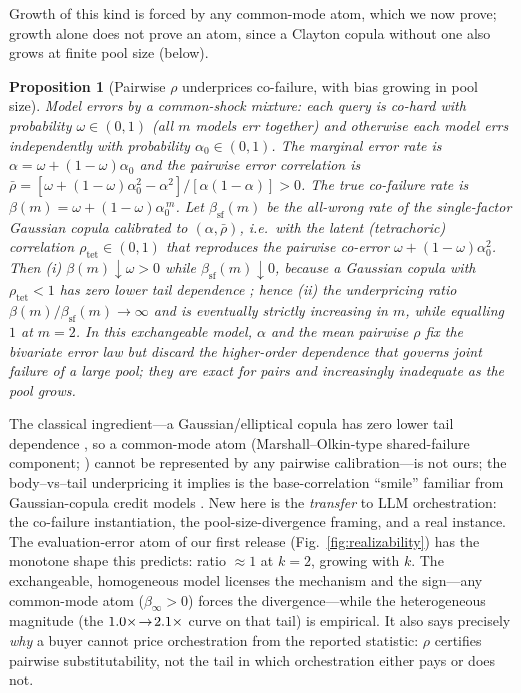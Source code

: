 \documentclass[11pt]{article}
\theoremstyle{plain}
\newtheorem{proposition}{Proposition}
\theoremstyle{definition}
\begin{document}
Growth of this kind is forced by any common-mode atom, which we now prove; growth alone does not prove an atom, since a
Clayton copula without one also grows at finite pool size (below).

\begin{proposition}[Pairwise $\rho$ underprices co-failure, with bias growing in pool size]\label{prop:poolbias}
Model errors by a common-shock mixture: each query is \emph{co-hard} with probability $\omega\in(0,1)$ (all $m$ models err
together) and otherwise each model errs independently with probability $\alpha_0\in(0,1)$. The marginal error rate is
$\alpha=\omega+(1-\omega)\alpha_0$ and the pairwise error correlation is
$\bar\rho=[\omega+(1-\omega)\alpha_0^2-\alpha^2]/[\alpha(1-\alpha)]>0$. The true co-failure rate is
$\beta(m)=\omega+(1-\omega)\alpha_0^{\,m}$. Let $\beta_{\mathrm{sf}}(m)$ be the all-wrong rate of the single-factor Gaussian copula
calibrated to $(\alpha,\bar\rho)$, i.e.\ with the latent (tetrachoric) correlation $\rho_{\mathrm{tet}}\in(0,1)$ that reproduces the
pairwise co-error $\omega+(1-\omega)\alpha_0^2$. Then (i) $\beta(m)\downarrow\omega>0$ while $\beta_{\mathrm{sf}}(m)\downarrow0$, because a Gaussian
copula with $\rho_{\mathrm{tet}}<1$ has zero lower tail dependence \citep{sibuya1959bivariate,embrechts2002correlation}; hence (ii) the underpricing ratio
$\beta(m)/\beta_{\mathrm{sf}}(m)\to\infty$ and is eventually strictly increasing in $m$, while equalling $1$ at $m=2$. In this
exchangeable model, $\alpha$ and the mean pairwise $\rho$ fix the \emph{bivariate} error law but discard the higher-order dependence that
governs joint failure of a large pool; they are exact for pairs and increasingly inadequate as the pool grows.
\end{proposition}
\noindent The classical ingredient---a Gaussian/elliptical copula has zero lower tail dependence
\citep{sibuya1959bivariate}, so a common-mode atom (Marshall--Olkin-type shared-failure component;
\citealp{marshall1967multivariate}) cannot be represented by any pairwise calibration---is not ours; the body--vs--tail
underpricing it implies is the base-correlation ``smile'' familiar from Gaussian-copula credit models
\citep{li2000default,donnelly2010devil}. New here is the \emph{transfer} to LLM orchestration: the co-failure
instantiation, the pool-size-divergence framing, and a real instance. The evaluation-error atom of our first release
(Fig.~\ref{fig:realizability}) has the monotone shape this predicts: ratio $\approx1$ at $k{=}2$, growing with
$k$. The exchangeable, homogeneous model licenses the mechanism and the sign---any common-mode atom ($\beta_\infty>0$) forces the
divergence---while the heterogeneous magnitude (the $1.0\times\!\to\!2.1\times$ curve on that tail) is
empirical. It also says precisely \emph{why} a buyer cannot price orchestration from the reported statistic:
$\rho$ certifies pairwise substitutability, not the tail in which orchestration either pays or does not.
\end{document}
